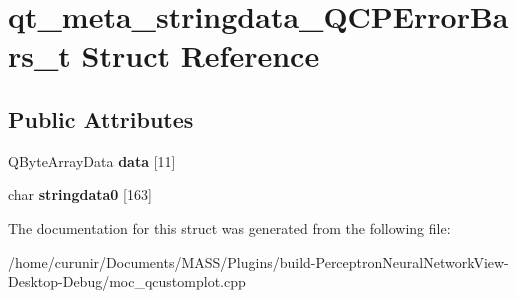 \hypertarget{structqt__meta__stringdata___q_c_p_error_bars__t}{}\section{qt\+\_\+meta\+\_\+stringdata\+\_\+\+Q\+C\+P\+Error\+Bars\+\_\+t Struct Reference}
\label{structqt__meta__stringdata___q_c_p_error_bars__t}
\subsection*{Public Attributes}
\begin{DoxyCompactItemize}
\item 
Q\+Byte\+Array\+Data {\bfseries data} \mbox{[}11\mbox{]}\hypertarget{structqt__meta__stringdata___q_c_p_error_bars__t_a806cc685f8b46afdca68d6d320f2450b}{}\label{structqt__meta__stringdata___q_c_p_error_bars__t_a806cc685f8b46afdca68d6d320f2450b}

\item 
char {\bfseries stringdata0} \mbox{[}163\mbox{]}\hypertarget{structqt__meta__stringdata___q_c_p_error_bars__t_a651dca586cf4ad7d2d0c36d8723c59b2}{}\label{structqt__meta__stringdata___q_c_p_error_bars__t_a651dca586cf4ad7d2d0c36d8723c59b2}

\end{DoxyCompactItemize}


The documentation for this struct was generated from the following file\+:\begin{DoxyCompactItemize}
\item 
/home/curunir/\+Documents/\+M\+A\+S\+S/\+Plugins/build-\/\+Perceptron\+Neural\+Network\+View-\/\+Desktop-\/\+Debug/moc\+\_\+qcustomplot.\+cpp\end{DoxyCompactItemize}
